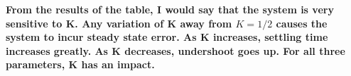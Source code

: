 \documentclass[12pt, letterpaper]{../assignment}
\begin{document}
\begin{answer}
\textbf{
From the results of the table, I would say that the system is very sensitive to K.
Any variation of K away from $K = 1/2$ causes the system to incur steady state error.
As K increases, settling time increases greatly. As K decreases, undershoot goes up.
For all three parameters, K has an impact.}
\end{answer}
    

\end{document}
